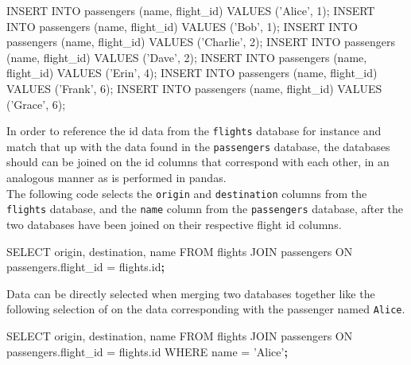 \documentclass[]{book}
\newenvironment{Shaded}{\begin{snugshade}}{\end{snugshade}}
\newcommand{\KeywordTok}[1]{\textcolor[rgb]{0.13,0.29,0.53}{\textbf{#1}}}
\newcommand{\StringTok}[1]{\textcolor[rgb]{0.31,0.60,0.02}{#1}}
\newcommand{\ExtensionTok}[1]{#1}
\newcommand{\NormalTok}[1]{#1}
\begin{document}
\begin{Shaded}
\begin{Highlighting}[]
\ExtensionTok{INSERT}\NormalTok{ INTO passengers (name, flight_id) }\ExtensionTok{VALUES}\NormalTok{ (}\StringTok{'Alice'}\NormalTok{, 1);  }
\ExtensionTok{INSERT}\NormalTok{ INTO passengers (name, flight_id) }\ExtensionTok{VALUES}\NormalTok{ (}\StringTok{'Bob'}\NormalTok{, 1);    }
\ExtensionTok{INSERT}\NormalTok{ INTO passengers (name, flight_id) }\ExtensionTok{VALUES}\NormalTok{ (}\StringTok{'Charlie'}\NormalTok{, 2);}
\ExtensionTok{INSERT}\NormalTok{ INTO passengers (name, flight_id) }\ExtensionTok{VALUES}\NormalTok{ (}\StringTok{'Dave'}\NormalTok{, 2);   }
\ExtensionTok{INSERT}\NormalTok{ INTO passengers (name, flight_id) }\ExtensionTok{VALUES}\NormalTok{ (}\StringTok{'Erin'}\NormalTok{, 4);   }
\ExtensionTok{INSERT}\NormalTok{ INTO passengers (name, flight_id) }\ExtensionTok{VALUES}\NormalTok{ (}\StringTok{'Frank'}\NormalTok{, 6);  }
\ExtensionTok{INSERT}\NormalTok{ INTO passengers (name, flight_id) }\ExtensionTok{VALUES}\NormalTok{ (}\StringTok{'Grace'}\NormalTok{, 6);  }
\end{Highlighting}
\end{Shaded}

In order to reference the id data from the \texttt{flights} database for
instance and match that up with the data found in the
\texttt{passengers} database, the databases should can be joined on the
id columns that correspond with each other, in an analogous manner as is
performed in pandas.\\
The following code selects the \texttt{origin} and \texttt{destination}
columns from the \texttt{flights} database, and the \texttt{name} column
from the \texttt{passengers} database, after the two databases have been
joined on their respective flight id columns.

\begin{Shaded}
\begin{Highlighting}[]
\ExtensionTok{SELECT}\NormalTok{ origin, destination, name FROM flights JOIN passengers ON passengers.flight_id = flights.id}\KeywordTok{;}
\end{Highlighting}
\end{Shaded}

Data can be directly selected when merging two databases together like
the following selection of on the data corresponding with the passenger
named \texttt{Alice}.

\begin{Shaded}
\begin{Highlighting}[]
\ExtensionTok{SELECT}\NormalTok{ origin, destination, name FROM flights JOIN passengers ON passengers.flight_id = flights.id WHERE name = }\StringTok{'Alice'}\KeywordTok{;}
\end{Highlighting}
\end{Shaded}
\end{document}
